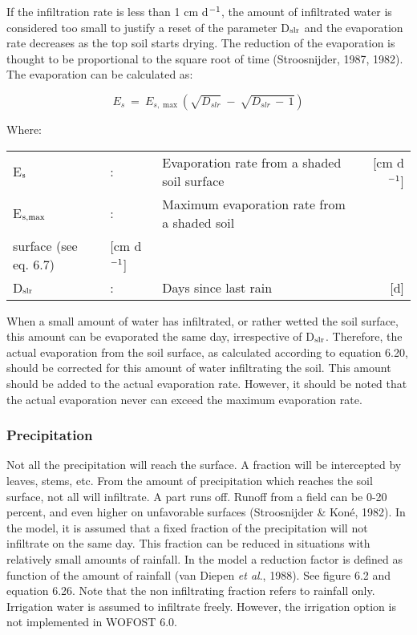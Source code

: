 If the infiltration rate is less than 1 cm d$^{{\rm -1}}$, the amount of infiltrated water is consid\-ered
too small to justify a reset of the parameter D$_{{\rm slr}}$ and the evaporation rate decreases as the
top soil starts drying. The reduction of the evaporation is thought to be proportional to the
square root of time (Stroosnijder, 1987, 1982). The evaporation can be calculated as:

\begin{equation}
E _{s} ~=~ E _{s,\max } ( \sqrt{D _{slr} } ~-~ \sqrt{D _{slr} \, -\, 1} )
\end{equation}

Where:\\
\begin{tabularx}{\textwidth}{llXr}
E$_{{\rm s}}$ &:& Evaporation rate from a shaded soil surface  & [cm d$^{{\rm -1}}$]\\
E$_{{\rm s,max}}$ &:& Maximum evaporation rate from a shaded soil\\
   surface (see eq. 6.7)  & [cm d$^{{\rm -1}}$]\\
D$_{{\rm slr}}$ &:& Days since last rain  & [d]\\
\end{tabularx}

When a small amount of water has infiltrated, or rather wetted the soil surface, this
amount can be evaporated the same day, irrespective of D$_{{\rm slr}}$. Therefore, the actual
evaporation from the soil surface, as calculated according to equation 6.20, should be
corrected for this amount of water infiltrating the soil. This amount should be added to
the actual evaporation rate. However, it should be noted that the actual evaporation never
can exceed the maximum evaporation rate.

\subsubsection{Precipitation}
Not all the precipitation will reach the surface. A fraction will be intercepted by leaves,
stems, etc. From the amount of precipitation which reaches the soil surface, not all will
infiltrate. A part runs off. Runoff from a field can be 0-20 percent, and even higher on
unfavorable surfaces (Stroosnijder \& Kon\'{e}, 1982). In the model, it is assumed that a
fixed fraction of the precipitation will not infiltrate on the same day. This fraction can be
reduced in situations with relatively small amounts of rainfall. In the model a reduction
factor is defined as function of the amount of rainfall (van Diepen {\it et al\/}., 1988). See 
figure 6.2 and equation 6.26. Note that the non infiltrating fraction refers to rainfall only.
Irrigation water is assumed to infiltrate freely. However, the irrigation option is not
implemented in WOFOST 6.0.

